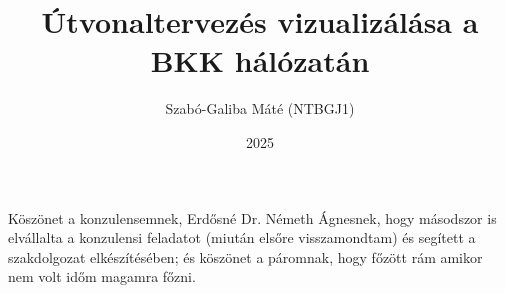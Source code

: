 \documentclass[
]{elteikthesis}[2024/04/26]
\title{Útvonaltervezés vizualizálása a BKK hálózatán} %
\date{2025} %
\author{Szabó-Galiba Máté (NTBGJ1)}
\affiliation{Egyetemi adjunktus} %
\begin{document}


\maketitle


\tableofcontents
\cleardoublepage


\cleardoublepage


\cleardoublepage


\cleardoublepage


\cleardoublepage

\chapter*{\acklabel}
Köszönet a konzulensemnek, Erdősné Dr. Németh Ágnesnek, hogy másodszor is elvállalta a konzulensi feladatot (miután elsőre visszamondtam) és segített a szakdolgozat elkészítésében; és köszönet a páromnak, hogy főzött rám amikor nem volt időm magamra főzni.

{}
\printbibliography[title=\biblabel]
\cleardoublepage

{}
\listoffigures
\cleardoublepage

{}
\listoftables
\cleardoublepage


{}
\lstlistoflistings
\cleardoublepage

\end{document}

